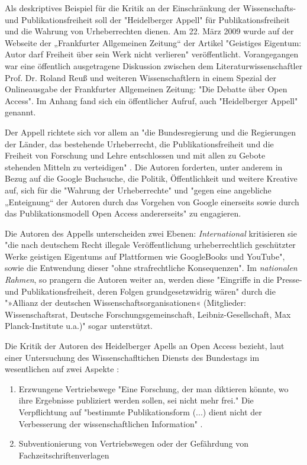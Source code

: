 Als deskriptives Beispiel für die Kritik an der Einschränkung der Wissenschafts- und Publikationsfreiheit soll der "Heidelberger Appell" für Publikationsfreiheit und die Wahrung von Urheberrechten dienen. Am 22. März 2009 wurde auf der Webseite der „Frankfurter Allgemeinen Zeitung“ der Artikel "Geistiges Eigentum: Autor darf Freiheit über sein Werk nicht verlieren" \cite{faz_heidelberger_apell_2009} veröffentlicht. Vorangegangen war eine öffentlich ausgetragene Diskussion zwischen dem Literaturwissenschaftler Prof. Dr. Roland Reuß und weiteren Wissenschaftlern in einem Spezial der Onlineausgabe der Frankfurter Allgemeinen Zeitung: "Die Debatte über Open Access". Im Anhang fand sich ein öffentlicher Aufruf, auch "Heidelberger Appell" genannt. 

Der Appell richtete sich vor allem an "die Bundesregierung und die Regierungen der Länder, das bestehende Urheberrecht, die Publikationsfreiheit und die Freiheit von Forschung und Lehre entschlossen und mit allen zu Gebote stehenden Mitteln zu verteidigen" \cite{ITK_2009}. Die Autoren forderten, unter anderem in Bezug auf die Google Buchsuche, die Politik, Öffentlichkeit und weitere Kreative auf, sich für die "Wahrung der Urheberrechte" und "gegen eine angebliche „Enteignung“ der Autoren durch das Vorgehen von Google einerseits sowie durch das Publikationsmodell Open Access andererseits" \cite{WD_bundestag_2009} zu engagieren. 

Die Autoren des Appells unterscheiden zwei Ebenen: \textit{International} kritisieren sie "die nach deutschem Recht illegale Veröffentlichung urheberrechtlich geschützter Werke geistigen Eigentums auf Plattformen wie GoogleBooks und YouTube", sowie die Entwendung dieser "ohne strafrechtliche Konsequenzen". Im \textit{nationalen Rahmen}, so prangern die Autoren weiter an, werden diese "Eingriffe in die Presse- und Publikationsfreiheit, deren Folgen grundgesetzwidrig wären" durch die "»Allianz der deutschen Wissenschaftsorganisationen« (Mitglieder: Wissenschaftsrat, Deutsche Forschungsgemeinschaft, Leibniz-Gesellschaft, Max Planck-Institute u.a.)" sogar unterstützt.\cite{ITK_2009}

Die Kritik der Autoren des Heidelberger Apells an Open Access bezieht, laut einer Untersuchung des Wissenschafltichen Diensts des Bundestags im wesentlichen auf zwei Aspekte \cite{WD_bundestag_2009}:
\begin{enumerate}
\item Erzwungene Vertriebswege
"Eine Forschung, der man diktieren könnte, wo ihre Ergebnisse publiziert werden sollen, sei nicht mehr frei." Die Verpflichtung auf "bestimmte Publikationsform (...) dient nicht der Verbesserung der wissenschaftlichen Information" \cite{ITK_2009}.
\item Subventionierung von Vertriebswegen oder der Gefährdung von Fachzeitschriftenverlagen
\end{enumerate}

